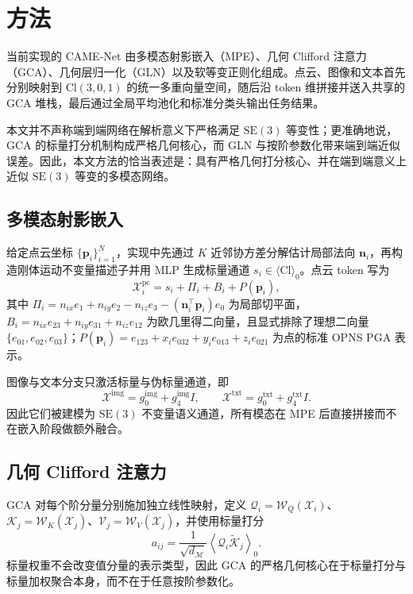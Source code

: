 ﻿\section{方法}\label{sec:method}
当前实现的 CAME-Net 由多模态射影嵌入（MPE）、几何 Clifford 注意力（GCA）、几何层归一化（GLN）以及软等变正则化组成。点云、图像和文本首先分别映射到 $\mathrm{Cl}(3,0,1)$ 的统一多重向量空间，随后沿 token 维拼接并送入共享的 GCA 堆栈，最后通过全局平均池化和标准分类头输出任务结果。

本文并不声称端到端网络在解析意义下严格满足 $\mathrm{SE}(3)$ 等变性；更准确地说，GCA 的标量打分机制构成严格几何核心，而 GLN 与按阶参数化带来端到端近似误差。因此，本文方法的恰当表述是：具有严格几何打分核心、并在端到端意义上近似 $\mathrm{SE}(3)$ 等变的多模态网络。

\subsection{多模态射影嵌入}\label{sec:mpe}
给定点云坐标 $\{\mathbf{p}_i\}_{i=1}^N$，实现中先通过 $K$ 近邻协方差分解估计局部法向 $\mathbf{n}_i$，再构造刚体运动不变量描述子并用 MLP 生成标量通道 $s_i\in\langle\mathrm{Cl}\rangle_0$。点云 token 写为
\begin{equation}\label{eq:mpe_pc_impl}
\mathcal{X}_i^{\mathrm{pc}} = s_i + \Pi_i + B_i + P(\mathbf{p}_i),
\end{equation}
其中 $\Pi_i = n_{ix}e_1 + n_{iy}e_2 - n_{iz}e_3 - (\mathbf{n}_i^\top\mathbf{p}_i)e_0$ 为局部切平面，$B_i = n_{ix}e_{23} + n_{iy}e_{31} + n_{iz}e_{12}$ 为欧几里得二向量，且显式排除了理想二向量 $\{e_{01},e_{02},e_{03}\}$；$P(\mathbf{p}_i)=e_{123}+x_ie_{032}+y_ie_{013}+z_ie_{021}$ 为点的标准 OPNS PGA 表示。

图像与文本分支只激活标量与伪标量通道，即
\begin{equation}\label{eq:mpe_img_txt_impl}
\mathcal{X}^{\mathrm{img}} = g_0^{\mathrm{img}} + g_4^{\mathrm{img}}I,\qquad
\mathcal{X}^{\mathrm{txt}} = g_0^{\mathrm{txt}} + g_4^{\mathrm{txt}}I.
\end{equation}
因此它们被建模为 $\mathrm{SE}(3)$ 不变量语义通道，所有模态在 MPE 后直接拼接而不在嵌入阶段做额外融合。

\subsection{几何 Clifford 注意力}\label{sec:gca}
GCA 对每个阶分量分别施加独立线性映射，定义 $\mathcal{Q}_i=\mathcal{W}_Q(\mathcal{X}_i)$、$\mathcal{K}_j=\mathcal{W}_K(\mathcal{X}_j)$、$\mathcal{V}_j=\mathcal{W}_V(\mathcal{X}_j)$，并使用标量打分
\begin{equation}\label{eq:attn_score_impl}
a_{ij}=\frac{1}{\sqrt{d_{\mathcal{M}}}}\left\langle \mathcal{Q}_i\widetilde{\mathcal{K}}_j \right\rangle_0.
\end{equation}
标量权重不会改变值分量的表示类型，因此 GCA 的严格几何核心在于标量打分与标量加权聚合本身，而不在于任意按阶参数化。

